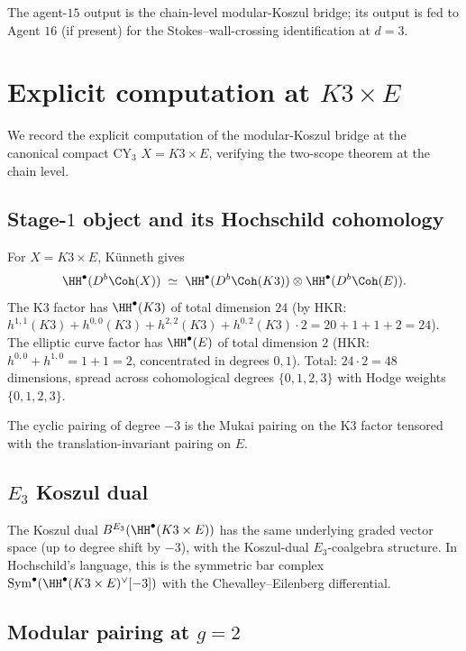 The agent-$15$ output is the chain-level modular-Koszul bridge; its
output is fed to Agent $16$ (if present) for the Stokes--wall-crossing
identification at $d = 3$.


\section{Explicit computation at $K3 \times E$}
\label{sec:explicit-k3e-computation}

We record the explicit computation of the modular-Koszul bridge at the
canonical compact CY$_3$ $X = K3 \times E$, verifying the two-scope
theorem at the chain level.

\subsection*{Stage-$1$ object and its Hochschild cohomology}

For $X = K3 \times E$, K\"unneth gives
\[
 \HH^\bullet(D^b\Coh(X)) \;\simeq\; \HH^\bullet(D^b\Coh(K3)) \otimes
 \HH^\bullet(D^b\Coh(E)).
\]
The K3 factor has $\HH^\bullet(K3)$ of total dimension $24$ (by HKR:
$h^{1, 1}(K3) + h^{0, 0}(K3) + h^{2, 2}(K3) + h^{0, 2}(K3) \cdot 2 =
20 + 1 + 1 + 2 = 24$). The elliptic curve factor has $\HH^\bullet(E)$
of total dimension $2$ (HKR: $h^{0, 0} + h^{1, 0} = 1 + 1 = 2$,
concentrated in degrees $0, 1$). Total: $24 \cdot 2 = 48$ dimensions,
spread across cohomological degrees $\{0, 1, 2, 3\}$ with Hodge weights
$\{0, 1, 2, 3\}$.

The cyclic pairing of degree $-3$ is the Mukai pairing on the K3
factor tensored with the translation-invariant pairing on $E$.

\subsection*{$E_3$ Koszul dual}

The Koszul dual $B^{E_3}(\HH^\bullet(K3 \times E))$ has the same
underlying graded vector space (up to degree shift by $-3$), with the
Koszul-dual $E_3$-coalgebra structure. In Hochschild's language, this
is the symmetric bar complex $\mathrm{Sym}^\bullet(\HH^\bullet(K3 \times E)^\vee[-3])$
with the Chevalley--Eilenberg differential.

\subsection*{Modular pairing at $g = 2$}

